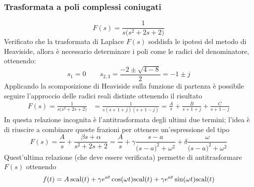 		\subsubsection{Trasformata a poli complessi coniugati}			
			\[ F(s) = \frac 1 {s \big(s^2+2s + 2\big)} \]
			Verificato che la trasformata di Laplace $F(s)$ soddisfa le ipotesi del metodo di Heaviside, allora è necessario determinare i poli come le radici del denominatore, ottenendo:
			\[ s_1 = 0 \qquad s_{2,3} = \frac{-2\pm\sqrt{4-8}}{2} = -1 \pm j \]
			Applicando la scomposizione di Heaviside sulla funzione di partenza è possibile seguire l'approccio delle radici reali distinte ottenendo il risultato
			\begin{align*}
				F(s) = \frac 1 {s \big(s^2+2s + 2\big)} & = \frac{1}{s(s+ 1 + j)(s+1-j)} = \frac A s +\frac B {s+1+j} + \frac C {s+1-j} 
			\end{align*}
			In questa relazione incognita è l'antitrasformata degli ultimi due termini; l'idea è di riuscire a combinare queste frazioni per ottenere un'espressione del tipo
			\[F(s) = \frac A s + \frac{\beta s + \alpha}{s^2+2s+2} = \frac A s + \gamma \frac{s-a}{\big(s-a\big)^2+\omega^2} + \delta \frac{\omega}{\big(s-a\big)^2 + \omega^2}\]
			Quest'ultima relazione (che deve essere verificata) permette di antitrasformare $F(s)$ ottenendo
			\[f(t) = A\, \textrm{scal}(t) + \gamma e^{at} \cos(\omega t) \textrm{scal}(t) + \gamma e^{at} \sin(\omega t)\textrm{scal}(t)\]
			
